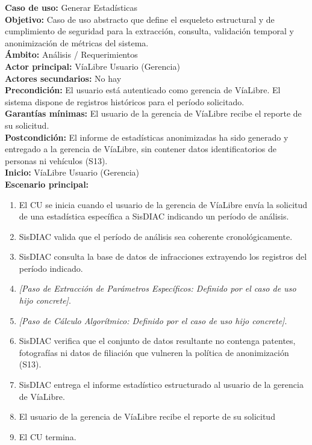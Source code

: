 \documentclass[12pt,letterpaper]{article}
\begin{document}
\noindent \textbf{Caso de uso:} Generar Estadísticas \\
\textbf{Objetivo:} Caso de uso abstracto que define el esqueleto estructural y de cumplimiento de seguridad para la extracción, consulta, validación temporal y anonimización de métricas del sistema. \\
\textbf{Ámbito:} Análisis / Requerimientos \\
\textbf{Actor principal:} VíaLibre Usuario (Gerencia) \\
\textbf{Actores secundarios:} No hay \\
\textbf{Precondición:} El usuario está autenticado como gerencia de VíaLibre. El sistema dispone de registros históricos para el período solicitado. \\
\textbf{Garantías mínimas:} El usuario de la gerencia de VíaLibre recibe el reporte de su solicitud. \\
\textbf{Postcondición:} El informe de estadísticas anonimizadas ha sido generado y entregado a la gerencia de VíaLibre, sin contener datos identificatorios de personas ni vehículos (S13). \\
\textbf{Inicio:} VíaLibre Usuario (Gerencia) \\

\noindent \textbf{Escenario principal:}
\begin{enumerate}[nosep, leftmargin=*]
	\item El CU se inicia cuando el usuario de la gerencia de VíaLibre envía la solicitud de una estadística específica a SisDIAC indicando un período de análisis.
	\item SisDIAC valida que el período de análisis sea coherente cronológicamente.
	\item SisDIAC consulta la base de datos de infracciones extrayendo los registros del período indicado.
	\item \textit{[Paso de Extracción de Parámetros Específicos: Definido por el caso de uso hijo concrete]}.
	\item \textit{[Paso de Cálculo Algorítmico: Definido por el caso de uso hijo concrete]}.
	\item SisDIAC verifica que el conjunto de datos resultante no contenga patentes, fotografías ni datos de filiación que vulneren la política de anonimización (S13).
	\item SisDIAC entrega el informe estadístico estructurado al usuario de la gerencia de VíaLibre.
	\item El usuario de la gerencia de VíaLibre recibe el reporte de su solicitud
	\item El CU termina.
\end{enumerate}
\end{document}
